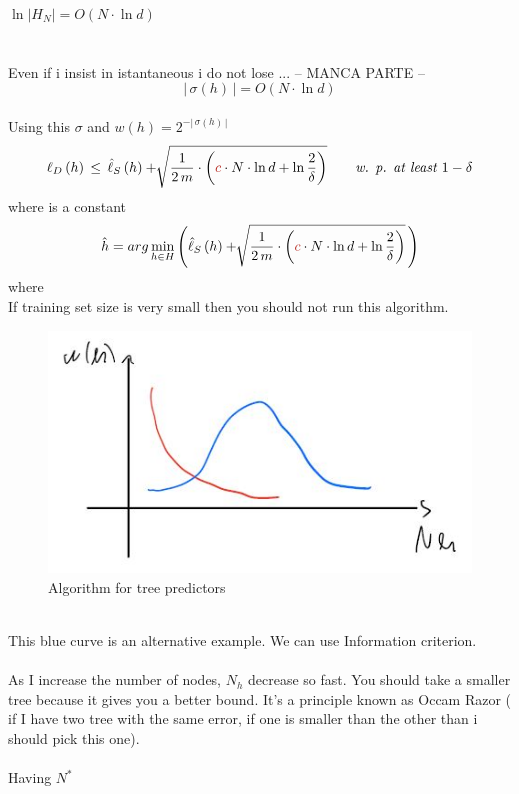 \documentclass[../main.tex]{subfiles}
\begin{document}
$
\ln |H_N| = O\left(N \cdot \ln d\right) 
$\\
\\\\
Even if i insist in istantaneous i do not lose ... -- MANCA PARTE --
\\
$$
| \, \sigma (h) \, | = O \left( N \cdot \ln d\right)
$$\\
Using this $\sigma$ and $w(h) = 2 ^{-|\, \sigma(h)\,|}
$
$$
\ell_D\left(h\right) \, \leq \, \hat{\ell}_S \left( h \right) + \sqrt[]{\frac{1}{2 \, m} \cdot \left( \red{c} \cdot N \cdot \ln d + \ln \frac{2}{\delta} \right) } \qquad \textit{w. p. at least $1-\delta$}
$$
where  is a constant
\\
$$
\hat{h} = arg\min_{h\in H} \left( \hat{\ell}_S \left( h \right) + \sqrt[]{\frac{1}{2 \, m} \cdot \left( \red{c} \cdot N \cdot \ln d + \ln \frac{2}{\delta} \right) } \, \right)
$$
where 
\\
If training set size is very small then you should not run this algorithm.
\begin{figure}[h]
    \centering
    \includegraphics[width=0.6\linewidth]{../img/lez9-img3.JPG}
    \caption{Algorithm for tree predictors}
\end{figure}\\
This blue curve is an alternative example. We can use Information criterion.\\\\
As I increase the number of nodes, $N_h$ decrease so fast. You should take a
smaller tree because it gives you a better bound. It’s a principle known as
Occam Razor ( if I have two tree with the same error, if one is smaller than the
other than i should pick this one).
\\\\
Having $N^*$
\end{document}
